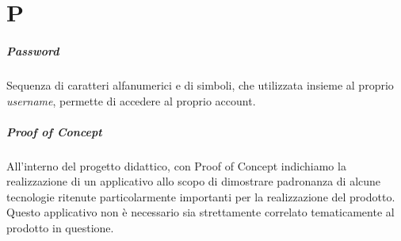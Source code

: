 \chapter{P}

\paragraph*{Password}
Sequenza di caratteri alfanumerici e di simboli, che utilizzata insieme al proprio \textit{username}, permette di accedere al proprio account.

\paragraph*{Proof of Concept}
All'interno del progetto didattico, con Proof of Concept indichiamo la realizzazione di un applicativo allo scopo di dimostrare padronanza di alcune tecnologie ritenute particolarmente importanti per la realizzazione del prodotto. Questo applicativo non è necessario sia strettamente correlato tematicamente al prodotto in questione.
